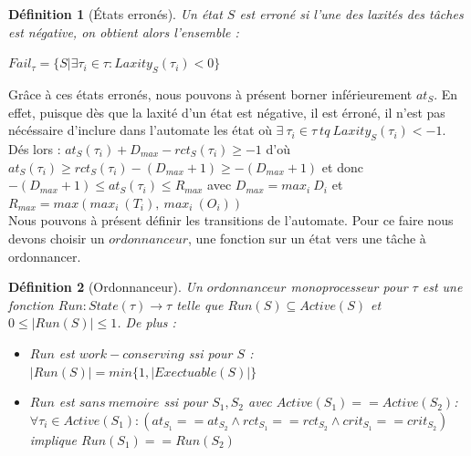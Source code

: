 \documentclass[a4paper]{report}
\theoremstyle{break}
\newtheorem{defin}{Définition}
\begin{document}
\begin{defin}[États erronés]
Un état $S$ est erroné si l'une des laxités des tâches est négative, on obtient alors l'ensemble :

$Fail_\tau = \{S|\exists \tau_i \in \tau : Laxity_S(\tau_i) < 0  \}$\\
\end{defin}

Grâce à ces états erronés, nous pouvons à présent borner inférieurement $at_S$. En effet, puisque dès que la laxité d'un état est négative, il est érroné, il n'est pas nécéssaire d'inclure dans l'automate les état où $\exists\ \tau_i \in \tau\ tq\ Laxity_S(\tau_i) < -1$. Dés lors : $at_S(\tau_i) + D_{max} - rct_S(\tau_i) \geq -1$ d'où $at_S(\tau_i) \geq rct_S(\tau_i) - (D_{max}+1) \geq -(D_{max}+1)$ et donc $-(D_{max}+1) \leq at_S(\tau_i) \leq R_{max}$ avec $D_{max} = max_i\ D_i$ et $R_{max} = max(max_i\ (T_i),\ max_i\ (O_i))$\\

Nous pouvons à présent définir les transitions de l'automate. Pour ce faire nous devons choisir un $ordonnanceur$, une fonction sur un état vers une tâche à ordonnancer.

\begin{defin}[Ordonnanceur]
Un $ordonnanceur$ monoprocesseur pour $\tau$ est une fonction $Run : State(\tau) \rightarrow \tau$ telle que $Run(S) \subseteq Active(S)$ et $0 \leq |Run(S)| \leq 1$.
De plus :
\begin{itemize}
\item $Run$ est $work-conserving$ ssi pour $S$ : $ |Run(S)| = min\{1, |Exectuable(S)|\}$
\item $Run$ est $sans\ memoire$ ssi pour $S_1,S_2$ avec $Active(S_1) == Active(S_2)$:
$\forall \tau_i \in Active(S_1) : (at_{S_1} == at_{S_2} \wedge rct_{S_1} == rct_{S_2} \wedge crit_{S_1} == crit_{S_2} )$ implique $Run(S_1) == Run(S_2)$
\end{itemize}

\end{defin}
\end{document}
